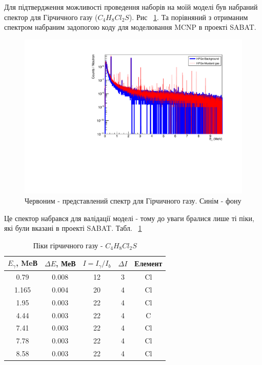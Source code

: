 \documentclass[a4paper, 14pt]{article}
\numberwithin{equation}{section}
\numberwithin{table}{section}
\begin{document}
	Для підтвердження можливості проведення наборів на моїй моделі був набраний спектор для Гірчичного газу ($C_4H_8Cl_2S$). Рис ~\ref{ris:MustBackAllLogSm}. Та порівняний з отриманим спектром набраним задопогою коду для моделювання MCNP в проекті SABAT.
	\begin{figure}[hbt!]
		\centering \includegraphics[width=1\textwidth]{res/smMustFonAll.pdf}
		\caption{Червоним - представлений спектр для Гірчичного газу. Синім - фону} 
		\label{ris:MustBackAllLogSm}	
	\end{figure} 
	Це спектор набрався для валідації моделі - тому до уваги бралися лише ті піки, які були вказані в проекті SABAT. Табл. ~\ref{tabl:ResultsMustard}
	\begin{table}[h]
		\centering
		\begin{tabular}{|c|c|c|c|c|} 
			\hline
			$E_{\gamma}$, MeВ & $\Delta{E}$, МеВ & $I = I_{\gamma} / I_{b}$ & $\Delta{I}$ & Елемент\\
			\hline
			0.79 & 0.008 & 12 & 3 & Cl\\
			\hline
			1.165 & 0.004 & 20 & 4 & Cl \\	
			\hline
			1.95 & 0.003 & 22 & 4 & Cl \\	
			\hline		
			4.44 & 0.003 & 22 & 4 & C \\	
			\hline
			7.41 & 0.003 & 22 & 4 & Cl\\	
			\hline
			7.78 & 0.003 & 22 & 4 & Cl\\	
			\hline			
			8.58 & 0.003 & 22 & 4 & Cl\\	
			\hline
		\end{tabular}
		\caption{Піки гірчичного газу - $C_4H_8Cl_2S$} 
		\label{tabl:ResultsMustard}
	\end{table}
	
\end{document}
